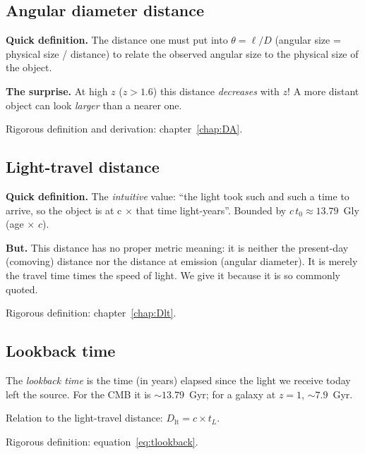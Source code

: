 \documentclass[11pt,a4paper,openany]{report}
\begin{document}
\subsection{Angular diameter distance}

\begin{tcolorbox}[gui]
\textbf{Quick definition.} The distance one must put into $\theta = \ell/D$
(angular size = physical size / distance) to relate the observed angular size
to the physical size of the object.

\medskip
\textbf{The surprise.} At high $z$ ($z > 1.6$) this distance \emph{decreases}
with $z$! A more distant object can look \emph{larger} than a nearer one.

\medskip
Rigorous definition and derivation: chapter~\ref{chap:DA}.
\end{tcolorbox}

\subsection{Light-travel distance}

\begin{tcolorbox}[gui]
\textbf{Quick definition.} The \emph{intuitive} value: “the light took such and
such a time to arrive, so the object is at c $\times$ that time light-years”.
Bounded by $c\,t_0 \approx 13.79$~Gly (age $\times$ $c$).

\medskip
\textbf{But.} This distance has no proper metric meaning: it is neither the
present-day (comoving) distance nor the distance at emission (angular
diameter). It is merely the travel time times the speed of light. We give it
because it is so commonly quoted.

\medskip
Rigorous definition: chapter~\ref{chap:Dlt}.
\end{tcolorbox}

\subsection{Lookback time}

\begin{tcolorbox}[gui]
The \emph{lookback time} is the time (in years) elapsed since the light we
receive today left the source. For the CMB it is $\sim 13.79$~Gyr; for a galaxy
at $z=1$, $\sim 7.9$~Gyr.

\medskip
Relation to the light-travel distance: $D_{\text{lt}} = c \times t_L$.

\medskip
Rigorous definition: equation~\eqref{eq:tlookback}.
\end{tcolorbox}
\end{document}
